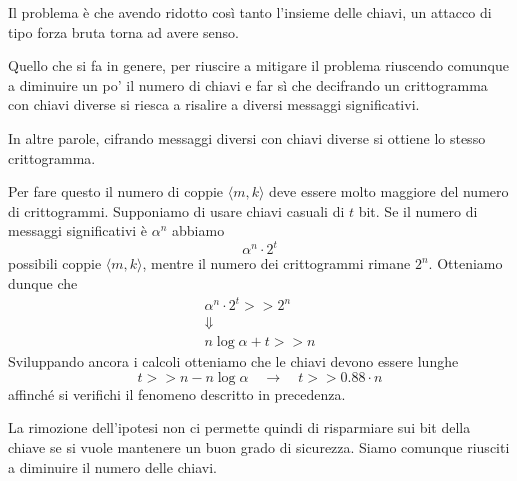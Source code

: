 Il problema \`e che avendo ridotto cos\`i tanto l'insieme delle chiavi, un attacco di tipo forza bruta torna ad avere
senso.

Quello che si fa in genere, per riuscire a mitigare il problema riuscendo comunque a diminuire un po' il numero di
chiavi e far s\`i che decifrando un crittogramma con chiavi diverse si riesca a risalire a diversi messaggi
significativi.

In altre parole, cifrando messaggi diversi con chiavi diverse si ottiene lo stesso crittogramma.

Per fare questo il numero di coppie $\langle m, k \rangle$ deve essere molto maggiore del numero di crittogrammi.
Supponiamo di usare chiavi casuali di $t$ bit. Se il numero di messaggi significativi \`e $\alpha^n$ abbiamo
\[ \alpha^n \cdot 2^t \]
possibili coppie $\langle m, k \rangle$, mentre il numero dei crittogrammi rimane $2^n$. Otteniamo dunque che
\begin{gather*}
	\alpha^n \cdot 2^t >> 2^n \\
	\Downarrow \\
	n \log \alpha + t >> n
\end{gather*}
Sviluppando ancora i calcoli otteniamo che le chiavi devono essere lunghe
\[ t >> n - n \log \alpha \quad \rightarrow \quad t >> 0.88 \cdot n \]
affinch\'e si verifichi il fenomeno descritto in precedenza.

La rimozione dell'ipotesi non ci permette quindi di risparmiare sui bit della chiave se si vuole mantenere un buon grado
di sicurezza. Siamo comunque riusciti a diminuire il numero delle chiavi.